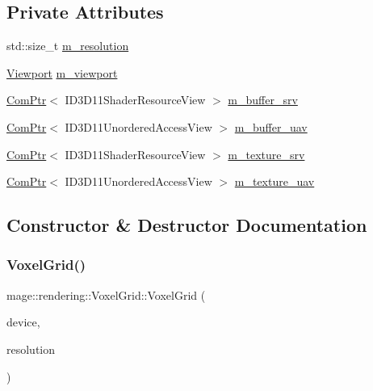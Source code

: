 \subsection*{Private Attributes}
\begin{DoxyCompactItemize}
\item 
std\+::size\+\_\+t \mbox{\hyperlink{classmage_1_1rendering_1_1_voxel_grid_a61b719eab0be50356fd3598926f15c7e}{m\+\_\+resolution}}
\item 
\mbox{\hyperlink{classmage_1_1rendering_1_1_viewport}{Viewport}} \mbox{\hyperlink{classmage_1_1rendering_1_1_voxel_grid_a02dca68f610cdb271b8895a9377af020}{m\+\_\+viewport}}
\item 
\mbox{\hyperlink{namespacemage_ae74f374780900893caa5555d1031fd79}{Com\+Ptr}}$<$ I\+D3\+D11\+Shader\+Resource\+View $>$ \mbox{\hyperlink{classmage_1_1rendering_1_1_voxel_grid_ab0d154365336f1b8a9a0921cb4ade6a2}{m\+\_\+buffer\+\_\+srv}}
\item 
\mbox{\hyperlink{namespacemage_ae74f374780900893caa5555d1031fd79}{Com\+Ptr}}$<$ I\+D3\+D11\+Unordered\+Access\+View $>$ \mbox{\hyperlink{classmage_1_1rendering_1_1_voxel_grid_a749d37651a7aebb6ab775424508ea92d}{m\+\_\+buffer\+\_\+uav}}
\item 
\mbox{\hyperlink{namespacemage_ae74f374780900893caa5555d1031fd79}{Com\+Ptr}}$<$ I\+D3\+D11\+Shader\+Resource\+View $>$ \mbox{\hyperlink{classmage_1_1rendering_1_1_voxel_grid_a81624e2bc21c444527156637c0415108}{m\+\_\+texture\+\_\+srv}}
\item 
\mbox{\hyperlink{namespacemage_ae74f374780900893caa5555d1031fd79}{Com\+Ptr}}$<$ I\+D3\+D11\+Unordered\+Access\+View $>$ \mbox{\hyperlink{classmage_1_1rendering_1_1_voxel_grid_a768675d9df84ea0283ba108c682df187}{m\+\_\+texture\+\_\+uav}}
\end{DoxyCompactItemize}


\subsection{Constructor \& Destructor Documentation}
\mbox{\label{classmage_1_1rendering_1_1_voxel_grid_aee58286cd8f0cd3df8ee6ba3fb3fc7eb}} 
\subsubsection{\texorpdfstring{Voxel\+Grid()}{VoxelGrid()}\hspace{0.1cm}{\footnotesize\ttfamily [1/3]}}
{\footnotesize\ttfamily mage\+::rendering\+::\+Voxel\+Grid\+::\+Voxel\+Grid (\begin{DoxyParamCaption}\item[{I\+D3\+D11\+Device \&}]{device,  }\item[{std\+::size\+\_\+t}]{resolution }\end{DoxyParamCaption})\hspace{0.3cm}{\ttfamily [explicit]}}

